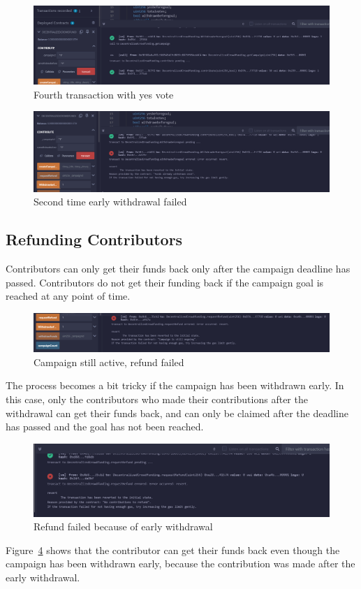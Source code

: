 \documentclass[12pt,reqno]{article}
\begin{document}
\begin{figure}[h!]
    \centering
    \includegraphics[width=0.6\linewidth]{Pictures/fourth_transaction.png}
    \caption{Fourth transaction with yes vote}
    \label{fourth_transaction}
\end{figure}
\newpage 
\newpage 
\begin{figure}[h!]
    \centering
    \includegraphics[width=0.6\linewidth]{Pictures/withdrawn_early.png}
    \caption{Second time early withdrawal failed}
    \label{withdrawn_early}
\end{figure}

\subsection{Refunding Contributors}
Contributors can only get their funds back only after the campaign 
deadline has passed. Contributors do not get their funding back if the 
campaign goal is reached at any point of time. 

\begin{figure}[h!]
    \centering
    \includegraphics[width=\linewidth]{Pictures/failed_refund1.png}
    \caption{Campaign still active, refund failed}
    \label{failed_refund1}
\end{figure}

The process becomes a bit tricky if the campaign has been withdrawn early. 
In this case, only the contributors who made their contributions 
after the withdrawal can get their funds back, and can only be claimed 
after the deadline has passed and the goal has not been reached. 

\begin{figure}[h!]
    \centering
    \includegraphics[width=0.6\linewidth]{Pictures/request_refund1.png}
    \caption{Refund failed because of early withdrawal}
    \label{refund1}
\end{figure}
Figure~\ref{refund1} shows that the contributor can get their funds 
back even though the campaign has been withdrawn early, because the 
contribution was made after the early withdrawal.
\end{document}

